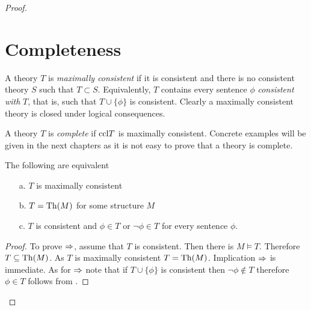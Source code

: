 \begin{proof}
\begin{proposition}

\end{proposition}

% 
% 
% 


\section{Completeness}

A theory $T$ is \emph{maximally consistent\/} if it is consistent and there is no consistent theory $S$ such that $T\subset S$.
Equivalently, $T$ contains every sentence $\phi$ \emph{consistent with\/} $T$, that is, such that $T\cup\{\phi\}$ is consistent.
Clearly a maximally consistent theory is closed under logical consequences.

A theory $T$ is \emph{complete\/} if ${\rm ccl} T$ is maximally consistent.
Concrete examples will be given in the next chapters as it is not easy to prove that a theory is complete.

\begin{proposition}\label{fattoconsistenzasen4sostretto}
The following are equivalent
\begin{itemize}
\item[a.] $T$ is maximally consistent
\item[b.] $T={\rm Th}(M)$ for some structure $M$
\item[c.] $T$ is consistent and $\phi\in T$ or $\neg\phi\in T$ for every sentence $\phi$.
\end{itemize}
\end{proposition}
\begin{proof}
To prove $\Rightarrow$, assume that $T$ is consistent.
Then there is $M\models T$.
Therefore $T\subseteq{\rm Th} (M)$.
As $T$ is maximally consistent $T={\rm Th}(M)$.
Implication $\Rightarrow$ is immediate.
 As for $\Rightarrow$ note that if $T\cup\{\phi\}$ is consistent then $\neg\phi\not\in T$ therefore $\phi\in T$ follows from .
\end{proof}


\end{proof}
